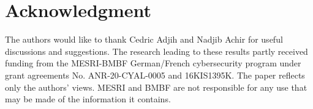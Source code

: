 \documentclass[journal]{IEEEtran}
\begin{document}
%





\section*{Acknowledgment}

The authors would like to thank Cedric Adjih and Nadjib Achir for useful discussions and suggestions. The research leading to these results partly received funding from the MESRI-BMBF German/French cybersecurity program under grant agreements No. ANR-20-CYAL-0005 and 16KIS1395K. The paper reflects only the authors’ views. MESRI and BMBF are not responsible for any use that may be made of the information it contains.

\ifCLASSOPTIONcaptionsoff
  \newpage
\fi



\end{document}
